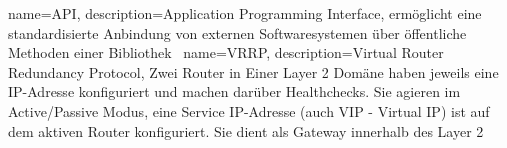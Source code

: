 {
  name=API,
  description={Application Programming Interface, ermöglicht eine
               standardisierte Anbindung von externen Softwaresystemen über
               öffentliche Methoden einer Bibliothek~\cite{HowDoAPIsEvolve}}
}
{
  name=VRRP,
  description={Virtual Router Redundancy Protocol, Zwei Router in Einer Layer 2 Domäne haben jeweils eine IP-Adresse konfiguriert und machen darüber Healthchecks. Sie agieren im Active/Passive Modus, eine Service IP-Adresse (auch VIP - Virtual IP) ist auf dem aktiven Router konfiguriert. Sie dient als Gateway innerhalb des Layer 2}
}
